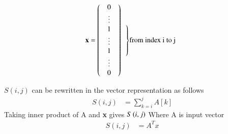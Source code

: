 \documentclass[journal,12pt,twocolumn]{IEEEtran}
\begin{document}
\[
{\bf x} = \left( 
      \begin{array}{c}
        \begin{array}{c}
          0 \\ \vdots \\ 1 \\ \vdots \\
        \end{array} \\
        \begin{array}{c}
          1 \\ \vdots \\ 0
        \end{array}
      \end{array}
    \right)
\begin{array}{c}
    \noleftdelimiter
    \vphantom{\begin{array}{c}
      x_1 \\ \vdots \\ x_{n_1}
    \end{array}}
    \right\} $from index i to j$
  \end{array}
\]

$S(i,j)$ can be rewritten in the vector representation as follows 
\begin{align}
     S(i,j) &=  \sum_{k=i}^{j} A[k]
\end{align}
Taking inner product of A and \textbf{x} gives $S\left(i,j\right)$  Where A is input vector
\begin{align}
     S(i,j) &= A^{T}x
\end{align}
\end{document}
